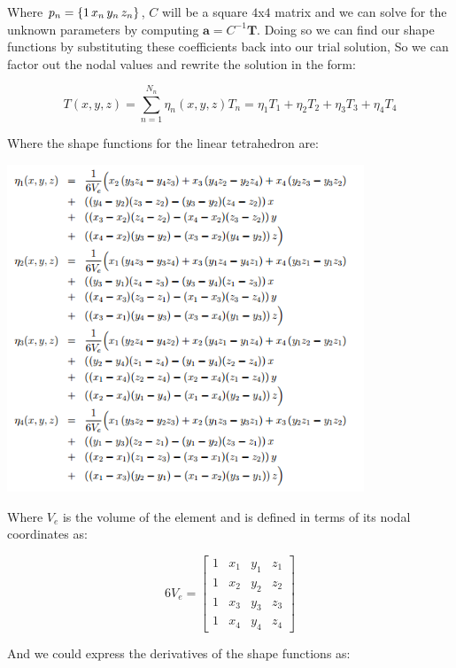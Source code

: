 \documentclass[12pt]{article}
\begin{document}
Where $p_n=\{1 \thinspace x_n \thinspace y_n \thinspace z_n\}$, $C$ will be a square $4$x$4$ matrix and we can solve for the unknown parameters by computing $\mathbf{a}=C^{-1}\mathbf{T}$. Doing so we can find our shape functions by substituting these coefficients back into our trial solution, So we can factor out the nodal values and rewrite the solution in the form:

\begin{equation}
T(x,y,z) = \sum_{n=1}^{N_n} \eta_n{(x,y,z)} T_n = \eta_1 T_1 + \eta_2 T_2 + \eta_3 T_3 + \eta_4 T_4
\end{equation}

Where the shape functions for the linear tetrahedron are:

\begin{center}
  \includegraphics[width=0.8\textwidth]{ShapeFunctions}
\end{center}

Where $V_e$ is the volume of the element and is defined in terms of its nodal coordinates as:

\begin{equation}
6V_e=\begin{bmatrix} 1 & x_1 & y_1 & z_1  \\ 1 & x_2 & y_2 & z_2  \\ 1 & x_3 & y_3 & z_3 \\ 1 & x_4 & y_4 & z_4 \end{bmatrix}
\end{equation}

And we could express the derivatives of the shape functions as:
\end{document}
